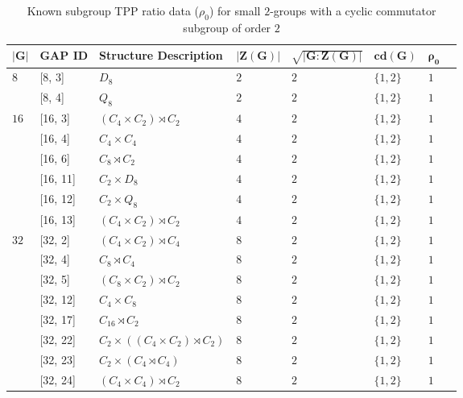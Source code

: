 \documentclass{amsart}
\theoremstyle{observation}
\theoremstyle{definition}
\theoremstyle{remark}
\numberwithin{equation}{section}
\begin{document}
\begin{table}[H]
  \begin{center}
    \caption{Known subgroup TPP ratio data ($\rho_0$) for small $2$-groups with a cyclic commutator subgroup of order $2$}
    \label{tbl:TblRho0GroupsOfTypeIIa}
    \begin{tabular}{llllllll}
      $\bm{|G|}$ & \multicolumn{1}{l}{\textbf{GAP ID}} & \multicolumn{1}{l}{\textbf{Structure Description}} & \multicolumn{1}{l}{$\bm{|Z(G)|}$} & \multicolumn{1}{l}{$\bm{\sqrt{|G:Z(G)|}}$} & \multicolumn{1}{l}{$\bm{\textbf{cd}(G)}$} & \multicolumn{1}{l}{$\bm{\rho_0}$} \\
      \toprule
        \multirow{2}{*}{$8$} &
            [8, 3] & $D_8$ & $2$ & $2$ & $\{1, 2\}$ & $1$ \\
          & [8, 4] & $Q_8$ & $2$ & $2$ & $\{1, 2\}$ & $1$ \\
        \hline
        \multirow{6}{*}{$16$} & 
            [16, 3] & $(C_4 \times C_2) \rtimes C_2$ & $4$ & $2$ & $\{1, 2\}$ & $1$ \\
          & [16, 4] & $C_4 \times C_4$ & $4$ & $2$ & $\{1, 2\}$ & $1$ \\
          & [16, 6] & $C_8 \rtimes C_2$ & $4$ & $2$ & $\{1, 2\}$ & $1$ \\
          & [16, 11] & $C_2 \times D_8$ & $4$ & $2$ & $\{1, 2\}$ & $1$ \\
          & [16, 12] & $C_2 \times Q_8$ & $4$ & $2$ & $\{1, 2\}$ & $1$ \\
          & [16, 13] & $(C_4 \times C_2) \rtimes C_2$ & $4$ & $2$ & $\{1, 2\}$ & $1$ \\
        \hline
        \multirow{5}{*}{$32$} &
            [32, 2] & $(C_4 \times C_2) \rtimes C_4$ & $8$ & $2$ & $\{1, 2\}$ & $1$ \\
          & [32, 4] & $C_8 \rtimes C_4$ & $8$ & $2$ & $\{1, 2\}$ & $1$ \\
          & [32, 5] & $(C_8 \times C_2) \rtimes C_2$ & $8$ & $2$ & $\{1, 2\}$ & $1$ \\
          & [32, 12] & $C_4 \times C_8$ & $8$ & $2$ & $\{1, 2\}$ & $1$ \\
          & [32, 17] & $C_{16} \rtimes C_2$ & $8$ & $2$ & $\{1, 2\}$ & $1$ \\
          & [32, 22] & $C_2 \times ((C_4 \times C_2) \rtimes C_2)$ & $8$ & $2$ & $\{1, 2\}$ & $1$ \\
          & [32, 23] & $C_2 \times (C_4 \rtimes C_4)$ & $8$ & $2$ & $\{1, 2\}$ & $1$ \\
          & [32, 24] & $(C_4 \times C_4) \rtimes C_2$ & $8$ & $2$ & $\{1, 2\}$ & $1$ \\

\end{tabular}
\end{center}
\end{table}
\end{document}
